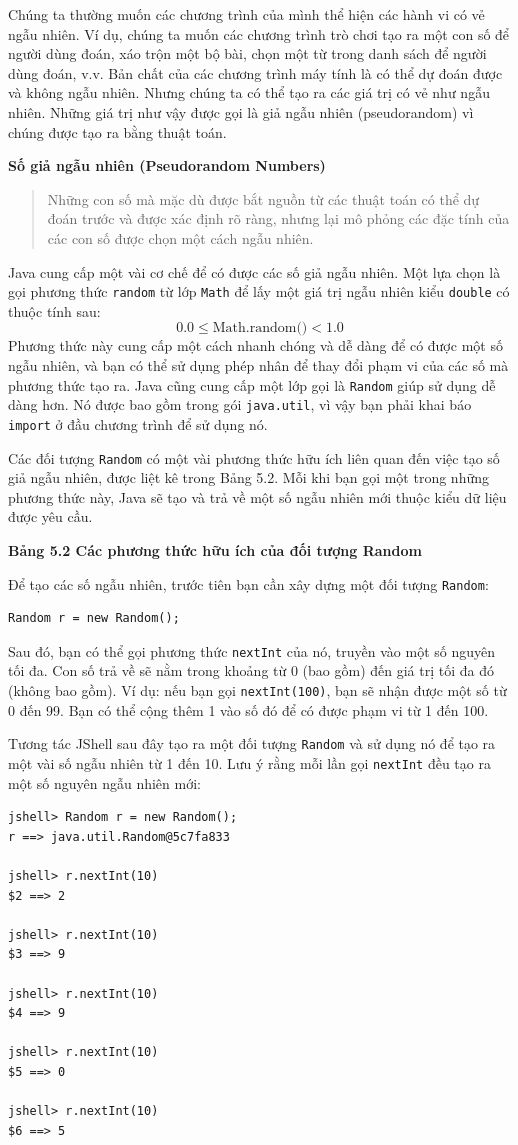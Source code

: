Chúng ta thường muốn các chương trình của mình thể hiện các hành vi có vẻ ngẫu nhiên. Ví dụ, chúng ta muốn các chương trình trò chơi tạo ra một con số để người dùng đoán, xáo trộn một bộ bài, chọn một từ trong danh sách để người dùng đoán, v.v. Bản chất của các chương trình máy tính là có thể dự đoán được và không ngẫu nhiên. Nhưng chúng ta có thể tạo ra các giá trị có vẻ như ngẫu nhiên. Những giá trị như vậy được gọi là giả ngẫu nhiên (pseudorandom) vì chúng được tạo ra bằng thuật toán.

\textbf{Số giả ngẫu nhiên (Pseudorandom Numbers)}
\begin{quote}
Những con số mà mặc dù được bắt nguồn từ các thuật toán có thể dự đoán trước và được xác định rõ ràng, nhưng lại mô phỏng các đặc tính của các con số được chọn một cách ngẫu nhiên.
\end{quote}

Java cung cấp một vài cơ chế để có được các số giả ngẫu nhiên. Một lựa chọn là gọi phương thức \texttt{random} từ lớp \texttt{Math} để lấy một giá trị ngẫu nhiên kiểu \texttt{double} có thuộc tính sau:
\[
0.0 \le \text{Math.random()} < 1.0
\]
Phương thức này cung cấp một cách nhanh chóng và dễ dàng để có được một số ngẫu nhiên, và bạn có thể sử dụng phép nhân để thay đổi phạm vi của các số mà phương thức tạo ra. Java cũng cung cấp một lớp gọi là \texttt{Random} giúp sử dụng dễ dàng hơn. Nó được bao gồm trong gói \texttt{java.util}, vì vậy bạn phải khai báo \texttt{import} ở đầu chương trình để sử dụng nó.

Các đối tượng \texttt{Random} có một vài phương thức hữu ích liên quan đến việc tạo số giả ngẫu nhiên, được liệt kê trong Bảng 5.2. Mỗi khi bạn gọi một trong những phương thức này, Java sẽ tạo và trả về một số ngẫu nhiên mới thuộc kiểu dữ liệu được yêu cầu.

\textbf{Bảng 5.2 Các phương thức hữu ích của đối tượng Random}

Để tạo các số ngẫu nhiên, trước tiên bạn cần xây dựng một đối tượng \texttt{Random}:
\begin{verbatim}
Random r = new Random();
\end{verbatim}
Sau đó, bạn có thể gọi phương thức \texttt{nextInt} của nó, truyền vào một số nguyên tối đa. Con số trả về sẽ nằm trong khoảng từ 0 (bao gồm) đến giá trị tối đa đó (không bao gồm). Ví dụ: nếu bạn gọi \texttt{nextInt(100)}, bạn sẽ nhận được một số từ 0 đến 99. Bạn có thể cộng thêm 1 vào số đó để có được phạm vi từ 1 đến 100.

Tương tác JShell sau đây tạo ra một đối tượng \texttt{Random} và sử dụng nó để tạo ra một vài số ngẫu nhiên từ 1 đến 10. Lưu ý rằng mỗi lần gọi \texttt{nextInt} đều tạo ra một số nguyên ngẫu nhiên mới:
\begin{verbatim}
jshell> Random r = new Random();
r ==> java.util.Random@5c7fa833 
 
jshell> r.nextInt(10)
$2 ==> 2 
 
jshell> r.nextInt(10)
$3 ==> 9 
 
jshell> r.nextInt(10)
$4 ==> 9 
 
jshell> r.nextInt(10)
$5 ==> 0 
 
jshell> r.nextInt(10)
$6 ==> 5
\end{verbatim}

